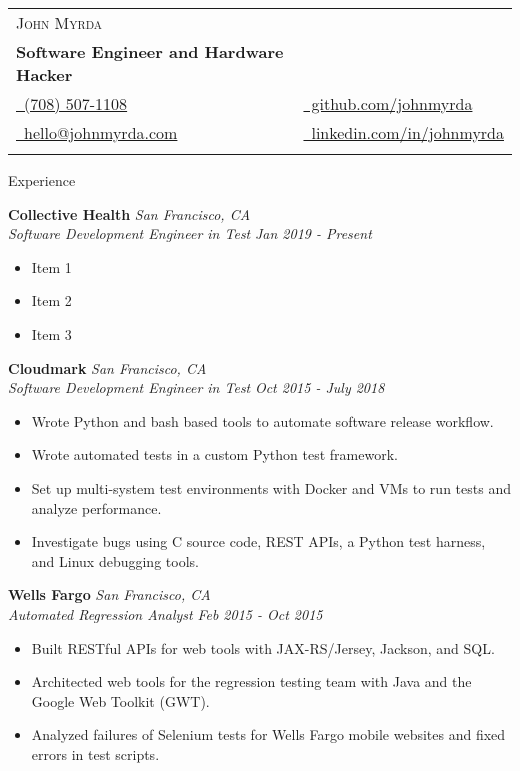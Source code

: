 \documentclass{article}
\newenvironment{changemargin}[2]{%
  \begin{list}{}{%
    \setlength{\topsep}{0pt}%
    \setlength{\leftmargin}{#1}%
    \setlength{\rightmargin}{#2}%
    \setlength{\listparindent}{\parindent}%
    \setlength{\itemindent}{\parindent}%
    \setlength{\parsep}{\parskip}%
  }%
  \item[]}{\end{list}
}
\newcommand{\lineover}{
	\begin{changemargin}{-0.05in}{-0.05in}
		\vspace*{-8pt}
		\hrulefill \\
		\vspace*{-2pt}
	\end{changemargin}
}
\newcommand{\header}[1]{
	\begin{changemargin}{-0.5in}{-0.5in}
		\scshape{#1}\\
  	\lineover
	\end{changemargin}
}
\newcommand{\contact}[7]{
	\begin{changemargin}{-0.5in}{-0.5in}
		\begin{tabular}{l l}
			\Large \scshape {#1}\\
			\textbf{#2}\\
			{#3} & {#5}\\ 
			{#4} & {#6}\\
			 & {#7}\\
		\end{tabular}
	\end{changemargin}
}
\newenvironment{body} {
	\vspace*{-16pt}
	\begin{changemargin}{-0.25in}{-0.5in}
  }	
	{\end{changemargin}
}
\begin{document}
\contact{John Myrda}
{Software Engineer and Hardware Hacker}
{\href{tel:7085071108}{\faPhone\ (708) 507-1108}}
{\href{mailto:hello@johnmyrda.com}{\faEnvelope\ hello@johnmyrda.com}}
{\href{https://github.com/johnmyrda/resume}{\faGithub\ github.com/johnmyrda}}
{\href{https://www.linkedin.com/in/johnmyrda}{\faLinkedin\ linkedin.com/in/johnmyrda}}

\header{Experience}


\begin{body}

	\vspace{20pt}
	
	\textbf{Collective Health} \hfill \emph{San Francisco, CA}\\
	\emph{Software Development Engineer in Test} \hfill \emph{Jan 2019 - Present}\\
	\begin{itemize} \itemsep -0pt  %
	    \item Item 1
		\item Item 2
		\item Item 3
	\end{itemize}	
	
	\textbf{Cloudmark} \hfill \emph{San Francisco, CA}\\
	\emph{Software Development Engineer in Test} \hfill \emph{Oct 2015 - July 2018}\\
	\begin{itemize} \itemsep -0pt  %
	    \item Wrote Python and bash based tools to automate software release workflow.
		\item Wrote automated tests in a custom Python test framework.
		\item Set up multi-system test environments with Docker and VMs to run tests and analyze performance.
\item Investigate bugs using C source code, REST APIs, a Python test harness, and Linux debugging tools.
	\end{itemize}

	\textbf{Wells Fargo} \hfill \emph{San Francisco, CA}\\
	\emph{Automated Regression Analyst} \hfill \emph{Feb 2015 - Oct 2015}\\
	\begin{itemize} \itemsep -0pt  %
		\item Built RESTful APIs for web tools with JAX-RS/Jersey, Jackson, and SQL.
		\item Architected web tools for the regression testing team with Java and the Google Web Toolkit (GWT).
		\item Analyzed failures of Selenium tests for Wells Fargo mobile websites and fixed errors in test scripts.	
	\end{itemize}


\end{body}
\end{document}
